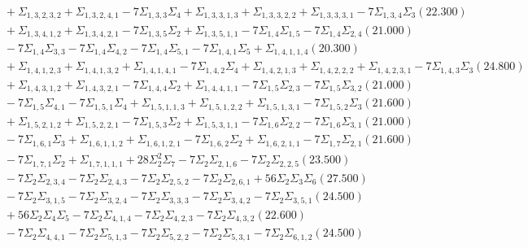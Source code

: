 \documentclass[12pt]{article}
\begin{document}
\begin{landscape}
\begin{align*}
		&\quad\quad +\Sigma_{1,3,2,3,2}+\Sigma_{1,3,2,4,1}-7\Sigma_{1,3,3}\Sigma_{4}+\Sigma_{1,3,3,1,3}+\Sigma_{1,3,3,2,2}+\Sigma_{1,3,3,3,1}-7\Sigma_{1,3,4}\Sigma_{3}(22.300) \\ 
		&\quad\quad +\Sigma_{1,3,4,1,2}+\Sigma_{1,3,4,2,1}-7\Sigma_{1,3,5}\Sigma_{2}+\Sigma_{1,3,5,1,1}-7\Sigma_{1,4}\Sigma_{1,5}-7\Sigma_{1,4}\Sigma_{2,4}(21.000) \\ 
		&\quad\quad -7\Sigma_{1,4}\Sigma_{3,3}-7\Sigma_{1,4}\Sigma_{4,2}-7\Sigma_{1,4}\Sigma_{5,1}-7\Sigma_{1,4,1}\Sigma_{5}+\Sigma_{1,4,1,1,4}(20.300) \\ 
		&\quad\quad +\Sigma_{1,4,1,2,3}+\Sigma_{1,4,1,3,2}+\Sigma_{1,4,1,4,1}-7\Sigma_{1,4,2}\Sigma_{4}+\Sigma_{1,4,2,1,3}+\Sigma_{1,4,2,2,2}+\Sigma_{1,4,2,3,1}-7\Sigma_{1,4,3}\Sigma_{3}(24.800) \\ 
		&\quad\quad +\Sigma_{1,4,3,1,2}+\Sigma_{1,4,3,2,1}-7\Sigma_{1,4,4}\Sigma_{2}+\Sigma_{1,4,4,1,1}-7\Sigma_{1,5}\Sigma_{2,3}-7\Sigma_{1,5}\Sigma_{3,2}(21.000) \\ 
		&\quad\quad -7\Sigma_{1,5}\Sigma_{4,1}-7\Sigma_{1,5,1}\Sigma_{4}+\Sigma_{1,5,1,1,3}+\Sigma_{1,5,1,2,2}+\Sigma_{1,5,1,3,1}-7\Sigma_{1,5,2}\Sigma_{3}(21.600) \\ 
		&\quad\quad +\Sigma_{1,5,2,1,2}+\Sigma_{1,5,2,2,1}-7\Sigma_{1,5,3}\Sigma_{2}+\Sigma_{1,5,3,1,1}-7\Sigma_{1,6}\Sigma_{2,2}-7\Sigma_{1,6}\Sigma_{3,1}(21.000) \\ 
		&\quad\quad -7\Sigma_{1,6,1}\Sigma_{3}+\Sigma_{1,6,1,1,2}+\Sigma_{1,6,1,2,1}-7\Sigma_{1,6,2}\Sigma_{2}+\Sigma_{1,6,2,1,1}-7\Sigma_{1,7}\Sigma_{2,1}(21.600) \\ 
		&\quad\quad -7\Sigma_{1,7,1}\Sigma_{2}+\Sigma_{1,7,1,1,1}+28\Sigma_{2}^{2}\Sigma_{7}-7\Sigma_{2}\Sigma_{2,1,6}-7\Sigma_{2}\Sigma_{2,2,5}(23.500) \\ 
		&\quad\quad -7\Sigma_{2}\Sigma_{2,3,4}-7\Sigma_{2}\Sigma_{2,4,3}-7\Sigma_{2}\Sigma_{2,5,2}-7\Sigma_{2}\Sigma_{2,6,1}+56\Sigma_{2}\Sigma_{3}\Sigma_{6}(27.500) \\ 
		&\quad\quad -7\Sigma_{2}\Sigma_{3,1,5}-7\Sigma_{2}\Sigma_{3,2,4}-7\Sigma_{2}\Sigma_{3,3,3}-7\Sigma_{2}\Sigma_{3,4,2}-7\Sigma_{2}\Sigma_{3,5,1}(24.500) \\ 
		&\quad\quad +56\Sigma_{2}\Sigma_{4}\Sigma_{5}-7\Sigma_{2}\Sigma_{4,1,4}-7\Sigma_{2}\Sigma_{4,2,3}-7\Sigma_{2}\Sigma_{4,3,2}(22.600) \\ 
		&\quad\quad -7\Sigma_{2}\Sigma_{4,4,1}-7\Sigma_{2}\Sigma_{5,1,3}-7\Sigma_{2}\Sigma_{5,2,2}-7\Sigma_{2}\Sigma_{5,3,1}-7\Sigma_{2}\Sigma_{6,1,2}(24.500) \\ 

\end{align*}
\end{landscape}
\end{document}
